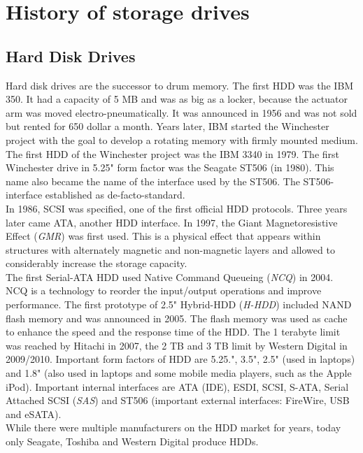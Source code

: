 \documentclass{acm_proc_article-sp}
\begin{document}
\section{History of storage drives}
\subsection{Hard Disk Drives}
Hard disk drives are the successor to drum memory. The first HDD was the IBM 350. It had a capacity of 5 MB and was as big as a locker, because the actuator arm was moved electro-pneumatically. It was announced in 1956 and was not sold but rented for 650 dollar a month. Years later, IBM started the Winchester project with the goal to develop a rotating memory with firmly mounted medium. The first HDD of the Winchester project was the IBM 3340 in 1979. The first Winchester drive in 5.25" form factor was the Seagate ST506 (in 1980). This name also became the name of the interface used by the ST506. The ST506-interface established as de-facto-standard.
\\
In 1986, SCSI was specified, one of the first official HDD protocols. Three years later came ATA, another HDD interface. In 1997, the Giant Magnetoresistive Effect (\emph{GMR}) was first used. This is a physical effect that appears within structures with alternately magnetic and non-magnetic layers and allowed to considerably increase the storage capacity.
\\
The first Serial-ATA HDD used Native Command Queueing (\emph{NCQ}) in 2004. NCQ is a technology to reorder the input/output operations and improve performance. The first prototype of 2.5" Hybrid-HDD (\emph{H-HDD}) included NAND flash memory and was announced in 2005. The flash memory was used as cache to enhance the speed and the response time of the HDD. The 1 terabyte limit was reached by Hitachi in 2007, the 2 TB and 3 TB limit by Western Digital in 2009/2010. Important form factors of HDD are 5.25.", 3.5", 2.5" (used in laptops) and 1.8" (also used in laptops and some mobile media players, such as the Apple iPod). Important internal interfaces are ATA (IDE), ESDI, SCSI, S-ATA, Serial Attached SCSI (\emph{SAS}) and ST506 (important external interfaces: FireWire, USB and eSATA).
\\
While there were multiple manufacturers on the HDD market for years, today only Seagate, Toshiba and Western Digital produce HDDs.
\end{document}
